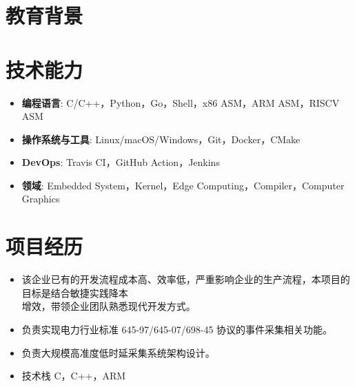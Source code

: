 \documentclass{resume}
\begin{document}
\lastupdated
{} %


\section{教育背景}

\section{技术能力}
\begin{itemize}[parsep=0.2ex]
  \item \textbf{编程语言}: C/C++，Python，Go，Shell，x86 ASM，ARM ASM，RISCV ASM
  \item \textbf{操作系统与工具}: Linux/macOS/Windows，Git，Docker，CMake
  \item \textbf{DevOps}: Travis CI，GitHub Action，Jenkins
  \item \textbf{领域}: Embedded System，Kernel，Edge Computing，Compiler，Computer Graphics
\end{itemize}

\section{项目经历}
\begin{itemize}
  \item 该企业已有的开发流程成本高、效率低，严重影响企业的生产流程，本项目的目标是结合敏捷实践降本\\增效，带领企业团队熟悉现代开发方式。
  \item 负责实现电力行业标准 645-97/645-07/698-45 协议的事件采集相关功能。
  \item 负责大规模高准度低时延采集系统架构设计。
  \item 技术栈 C，C++，ARM
\end{itemize}
\end{document}
